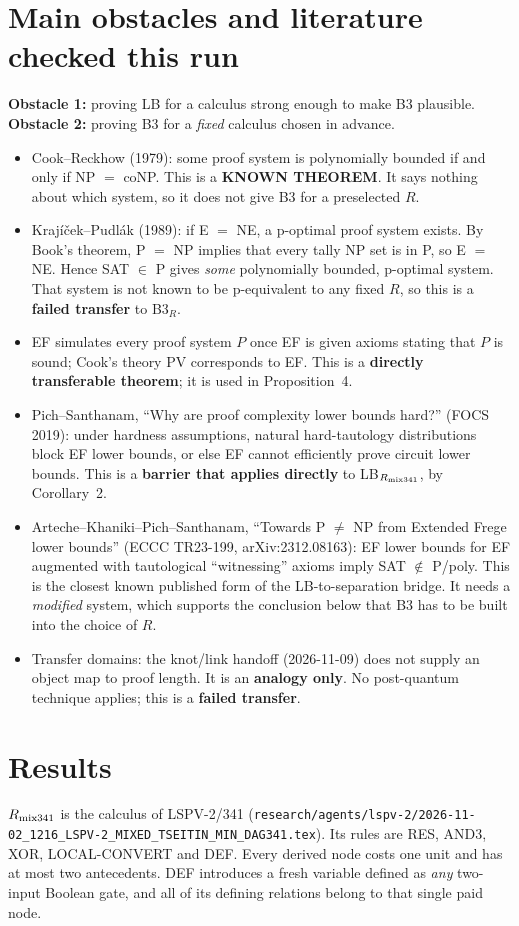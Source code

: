 \documentclass[11pt]{article}
\begin{document}
\section{Main obstacles and literature checked this run}
\textbf{Obstacle 1:} proving LB for a calculus strong enough to make B3 plausible.
\textbf{Obstacle 2:} proving B3 for a \emph{fixed} calculus chosen in advance.
\begin{itemize}
\item Cook--Reckhow (1979): some proof system is polynomially bounded if and only if NP $=$ coNP. This is a \textbf{KNOWN THEOREM}. It says nothing about which system, so it does not give B3 for a preselected $R$.
\item Krajíček--Pudlák (1989): if E $=$ NE, a p-optimal proof system exists. By Book's theorem, P $=$ NP implies that every tally NP set is in P, so E $=$ NE. Hence SAT $\in$ P gives \emph{some} polynomially bounded, p-optimal system. That system is not known to be p-equivalent to any fixed $R$, so this is a \textbf{failed transfer} to B3$_R$.
\item EF simulates every proof system $P$ once EF is given axioms stating that $P$ is sound; Cook's theory PV corresponds to EF. This is a \textbf{directly transferable theorem}; it is used in Proposition~4.
\item Pich--Santhanam, ``Why are proof complexity lower bounds hard?'' (FOCS 2019): under hardness assumptions, natural hard-tautology distributions block EF lower bounds, or else EF cannot efficiently prove circuit lower bounds. This is a \textbf{barrier that applies directly} to LB$_{R_{\rm mix341}}$, by Corollary~2.
\item Arteche--Khaniki--Pich--Santhanam, ``Towards P $\neq$ NP from Extended Frege lower bounds'' (ECCC TR23-199, arXiv:2312.08163): EF lower bounds for EF augmented with tautological ``witnessing'' axioms imply SAT $\notin$ P/poly. This is the closest known published form of the LB-to-separation bridge. It needs a \emph{modified} system, which supports the conclusion below that B3 has to be built into the choice of $R$.
\item Transfer domains: the knot/link handoff (2026-11-09) does not supply an object map to proof length. It is an \textbf{analogy only}. No post-quantum technique applies; this is a \textbf{failed transfer}.
\end{itemize}

\section{Results}
$R_{\rm mix341}$ is the calculus of LSPV-2/341 (\texttt{research/agents/lspv-2/2026-11-02\_1216\_LSPV-2\_MIXED\_TSEITIN\_MIN\_DAG341.tex}). Its rules are RES, AND3, XOR, LOCAL-CONVERT and DEF. Every derived node costs one unit and has at most two antecedents. DEF introduces a fresh variable defined as \emph{any} two-input Boolean gate, and all of its defining relations belong to that single paid node.
\end{document}

